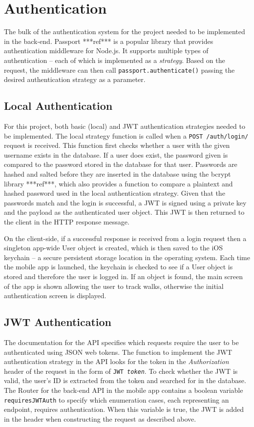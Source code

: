 \section{Authentication}

The bulk of the authentication system for the project needed to be implemented in the back-end. Passport ***ref*** is a popular library that provides authentication middleware for Node.js. It supports multiple types of authentication -- each of which is implemented as a \textit{strategy}. Based on the request, the middleware can then call \verb|passport.authenticate()| passing the desired authentication strategy as a parameter.

\subsection{Local Authentication}

For this project, both basic (local) and JWT authentication strategies needed to be implemented. The local strategy function is called when a \verb|POST /auth/login/| request is received. This function first checks whether a user with the given username exists in the database. If a user does exist, the password given is compared to the password stored in the database for that user. Passwords are hashed and salted before they are inserted in the database using the bcrypt library ***ref***, which also provides a function to compare a plaintext and hashed password used in the local authentication strategy. Given that the passwords match and the login is successful, a JWT is signed using a private key and the payload as the authenticated user object. This JWT is then returned to the client in the HTTP response message.

On the client-side, if a successful response is received from a login request then a singleton app-wide User object is created, which is then saved to the iOS keychain -- a secure persistent storage location in the operating system. Each time the mobile app is launched, the keychain is checked to see if a User object is stored and therefore the user is logged in. If an object is found, the main screen of the app is shown allowing the user to track walks, otherwise the initial authentication screen is displayed.

\subsection{JWT Authentication}

The documentation for the API specifies which requests require the user to be authenticated using JSON web tokens. The function to implement the JWT authentication strategy in the API looks for the token in the \textit{Authorization} header of the request in the form of \texttt{JWT \textit{token}}. To check whether the JWT is valid, the user's ID is extracted from the token and searched for in the database. The Router for the back-end API in the mobile app contains a boolean variable \verb|requiresJWTAuth| to specify which enumeration cases, each representing an endpoint, requires authentication. When this variable is true, the JWT is added in the header when constructing the request as described above.

